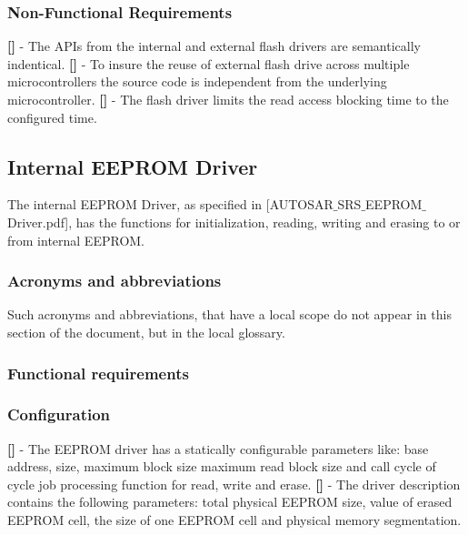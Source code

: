 \subsubsection{Non-Functional Requirements}
{\bf []} - The APIs from the internal and external flash drivers are semantically indentical.\newline
\newline
{\bf []} - To insure the reuse of external flash drive across multiple microcontrollers the source code is independent from the underlying microcontroller.\newline
\newline
{\bf []} - The flash driver limits the read access blocking time to the configured time.
\newpage

\subsection{Internal EEPROM Driver}
The internal EEPROM Driver, as specified in  [AUTOSAR$\_$SRS$\_$EEPROM$\_$Driver.pdf], has the functions for initialization, reading, writing and erasing to or from internal \mbox{EEPROM}.
\subsubsection{Acronyms and abbreviations}
Such acronyms and abbreviations, that have a local scope do not appear in this section of the document, but in the local glossary.
\subsubsection{Functional requirements}
\subsubsection{Configuration}
{\bf []} - The EEPROM driver has a statically configurable parameters like: base address, size, maximum block size maximum read block size and call cycle of cycle job processing function for read, write and erase.\newline
\newline
{\bf []} - The driver description contains the following parameters: total physical \mbox{EEPROM} size, value of erased \mbox{EEPROM} cell, the size of one \mbox{EEPROM} cell and physical memory segmentation.

